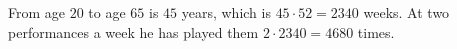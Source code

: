 From age $20$ to age $65$ is $45$ years, which is $45\cdot52=2340$ weeks. At two performances a week he has played them $2\cdot2340=\boxed{4680}$ times.
